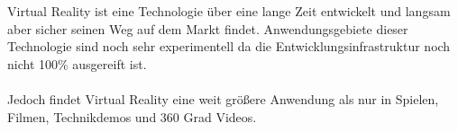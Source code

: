
Virtual Reality ist eine Technologie über eine lange Zeit entwickelt und langsam aber sicher seinen Weg auf dem Markt findet.
Anwendungsgebiete dieser Technologie sind noch sehr experimentell da die Entwicklungsinfrastruktur noch nicht 100\% ausgereift
ist.\\ \\
Jedoch findet Virtual Reality eine weit größere Anwendung als nur in Spielen, Filmen, Technikdemos und 360 Grad Videos.

